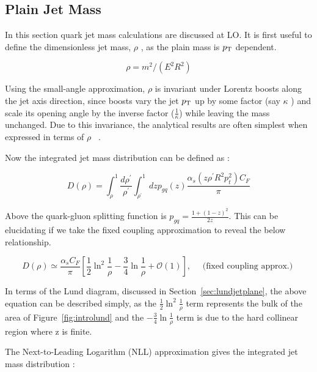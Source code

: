 \subsection{Plain Jet Mass }\label{sec:jetmass}


In this section quark jet mass calculations are discussed at LO. It is first useful to define the dimensionless jet mass, $\rho$ , as the plain mass is $p_{\mathrm{T}}$ dependent.


\begin{equation}
\rho=m^{2} /\left(E^{2} R^{2}\right)
\end{equation}



Using the small-angle approximation, $\rho$ is invariant under Lorentz boosts along the jet axis direction, since boosts vary the jet $p_{\mathrm{T}}$ up by some factor (say $\kappa$ ) and scale its opening angle by the inverse factor ($\frac{1}{\kappa}$) while leaving the mass unchanged. Due to this invariance, the analytical results are often simplest when expressed in terms of $\rho$ ~\cite{mmdt}.

Now the integrated jet mass distribution can be defined as :\newline

\begin{equation}
D(\rho)=\int_{\rho}^{1} \frac{d \rho^{\prime}}{\rho^{\prime}} \int_{\rho^{\prime}}^{1} d z p_{g q}(z) \frac{\alpha_{s}\left(z \rho^{\prime} R^{2} p_{t}^{2}\right) C_{F}}{\pi}
\end{equation}


Above the quark-gluon splitting function is $p_{g q}=\frac{1+(1-z)^{2}}{2 z}$. This can be elucidating if we take the fixed coupling approximation to reveal the below relationship.~\cite{mmdt}


\begin{equation}
D(\rho) \simeq \frac{\alpha_{s} C_{F}}{\pi}\left[\frac{1}{2} \ln ^{2} \frac{1}{\rho}-\frac{3}{4} \ln \frac{1}{\rho}+\mathcal{O}(1)\right], \quad \text { (fixed coupling approx.) }
\end{equation}

In terms of the Lund diagram, discussed in Section~\ref{sec:lundjetplane}, the above equation can be described simply, as the $\frac{1}{2} \ln ^{2} \frac{1}{\rho}$ term represents the bulk of the area of Figure~\ref{fig:introlund} and the $-\frac{3}{4} \ln \frac{1}{\rho}$ term is due to the hard collinear region where z is finite.


The Next-to-Leading Logarithm (NLL) approximation gives the integrated jet mass distribution :\newline


